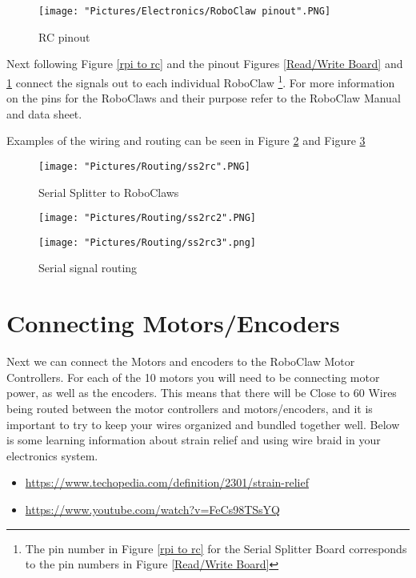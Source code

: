 \documentclass[12pt]{article}
\begin{document}
\begin{figure}[H]
 	\centering
	\texttt{[image: "Pictures/Electronics/RoboClaw pinout".PNG]}
 	\caption{RC pinout}
	\label{RC pinout}
\end{figure}

Next following Figure \ref{rpi to rc} and the pinout Figures \ref{Read/Write Board} and \ref{RC pinout} connect the signals out to each individual RoboClaw \footnote{The pin number in Figure \ref{rpi to rc} for the Serial Splitter Board corresponds to the pin numbers in Figure \ref{Read/Write Board}}. For more information on the pins for the RoboClaws and their purpose refer to the RoboClaw Manual and data sheet. 

\noindent Examples of the wiring and routing can be seen in Figure \ref{ss2rc1} and Figure \ref{ss2rc2}

\begin{figure}[H]
 	\centering
	\texttt{[image: "Pictures/Routing/ss2rc".PNG]}
 	\caption{Serial Splitter to RoboClaws}
	\label{ss2rc1}
\end{figure}

\begin{figure}[H]
 	\centering
  	\begin{minipage}[b]{0.50\textwidth}
		\texttt{[image: "Pictures/Routing/ss2rc2".PNG]}
  	\end{minipage}
  	\hfill
  	\begin{minipage}[b]{0.40\textwidth}
    		\texttt{[image: "Pictures/Routing/ss2rc3".png]}
  	\end{minipage}
	\caption{Serial signal routing}
	\label{ss2rc2}
\end{figure}

\section{Connecting Motors/Encoders}

Next we can connect the Motors and encoders to the RoboClaw Motor Controllers. For each of the 10 motors you will need to be connecting motor power, as well as the encoders. This means that there will be Close to 60 Wires being routed between the motor controllers and motors/encoders, and it is important to try to keep your wires organized and bundled together well. Below is some learning information about strain relief and using wire braid in your electronics system.

\begin{itemize}
	\item \href{https://www.techopedia.com/definition/2301/strain-relief}{https://www.techopedia.com/definition/2301/strain-relief}
	\item \href{https://www.youtube.com/watch?v=FeCs98TSsYQ}{https://www.youtube.com/watch?v=FeCs98TSsYQ}
\end{itemize}
\end{document}
